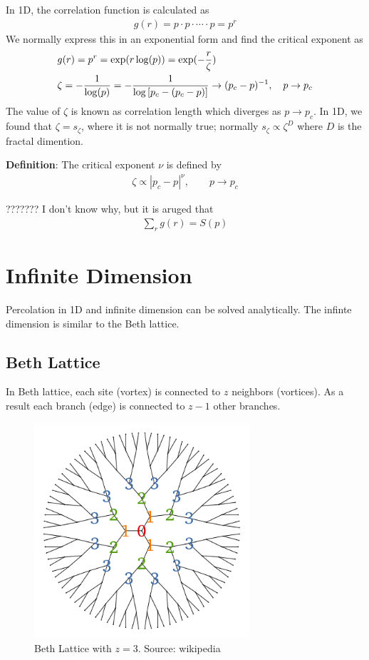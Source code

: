 In 1D, the correlation function is calculated as
%
\begin{align}
  g(r) = p \cdot p \cdot \cdots \cdot p =   p^r
\end{align}
%
We normally express this in an exponential form and find the critical
exponent as
%
\begin{align}
  & g(r) = p^r = \exp (r \log(p)) = \exp (-\frac{r}{\zeta})\\
  & \zeta = -\frac{1}{\log (p) } = -\frac{1}{\log\left[ p_c - (p_c-p)\right]} \to (p_c-p)^{-1}, \quad p\to p_c  
\end{align}
%
The value of $\zeta$ is known as correlation length which diverges as
$p\to p_c$. In 1D, we found that $\zeta = s_{\zeta}$, where it is not
normally true; normally $s_{\zeta} \propto \zeta^D$ where $D$ is the
fractal dimention.

\textbf{Definition}: The critical exponent $\nu$ is defined by
%
\begin{align}
  \zeta \propto |p_c-p|^{\nu}, \qquad p \to p_c
\end{align}
%

??????? I don't know why, but it is aruged that
%
\begin{align}
  \sum_r g(r) = S(p) 
\end{align}



\section{Infinite Dimension}

Percolation in 1D and infinite dimension can be solved
analytically. The infinte dimension is similar to the Beth lattice.

\subsection{Beth Lattice}

In Beth lattice, each site (vortex) is connected to $z$ neighbors
(vortices). As a result each branch (edge) is connected to $z-1$ other
branches.

\begin{figure}[h]
  \centering
  \includegraphics[width=8cm]{beth-lattice}
  \caption{Beth Lattice with $z=3$. Source: wikipedia}
\end{figure}

